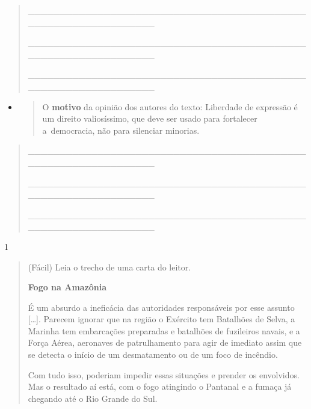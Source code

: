 \begin{itemize}
{{{\begin{itemize}
\begin{itemize}
\begin{itemize}
\begin{quote}
\_\_\_\_\_\_\_\_\_\_\_\_\_\_\_\_\_\_\_\_\_\_\_\_\_\_\_\_\_\_\_\_\_\_\_\_\_\_\_\_\_\_\_\_\_\_\_\_\_\_\_\_\_\_\_\_\_\_\_\_\_\_\_\_

\_\_\_\_\_\_\_\_\_\_\_\_\_\_\_\_\_\_\_\_\_\_\_\_\_\_\_\_\_\_\_\_\_\_\_\_\_\_\_\_\_\_\_\_\_\_\_\_\_\_\_\_\_\_\_\_\_\_\_\_\_\_\_\_

\_\_\_\_\_\_\_\_\_\_\_\_\_\_\_\_\_\_\_\_\_\_\_\_\_\_\_\_\_\_\_\_\_\_\_\_\_\_\_\_\_\_\_\_\_\_\_\_\_\_\_\_\_\_\_\_\_\_\_\_\_\_\_\_
\end{quote}

\begin{itemize}
\item
  \begin{quote}
  O \textbf{motivo} da opinião dos autores do texto: Liberdade de
  expressão é um direito valiosíssimo, que deve ser usado para
  fortalecer a~democracia, não para silenciar minorias.
  \end{quote}
\end{itemize}

\begin{quote}
\_\_\_\_\_\_\_\_\_\_\_\_\_\_\_\_\_\_\_\_\_\_\_\_\_\_\_\_\_\_\_\_\_\_\_\_\_\_\_\_\_\_\_\_\_\_\_\_\_\_\_\_\_\_\_\_\_\_\_\_\_\_\_\_

\_\_\_\_\_\_\_\_\_\_\_\_\_\_\_\_\_\_\_\_\_\_\_\_\_\_\_\_\_\_\_\_\_\_\_\_\_\_\_\_\_\_\_\_\_\_\_\_\_\_\_\_\_\_\_\_\_\_\_\_\_\_\_\_

\_\_\_\_\_\_\_\_\_\_\_\_\_\_\_\_\_\_\_\_\_\_\_\_\_\_\_\_\_\_\_\_\_\_\_\_\_\_\_\_\_\_\_\_\_\_\_\_\_\_\_\_\_\_\_\_\_\_\_\_\_\_\_\_
\end{quote}


\num{1}

\begin{quote}
(Fácil) Leia o trecho de uma carta do leitor.

\textbf{Fogo na Amazônia}

É um absurdo a ineficácia das autoridades responsáveis por esse assunto
{[}\ldots{}{]}. Parecem ignorar que na região o Exército tem Batalhões
de Selva, a Marinha tem embarcações preparadas e batalhões de fuzileiros
navais, e a Força Aérea, aeronaves de patrulhamento para agir de
imediato assim que se detecta o início de um desmatamento ou de um foco
de incêndio.

Com tudo isso, poderiam impedir essas situações e prender os envolvidos.
Mas o resultado aí está, com o fogo atingindo o Pantanal e a fumaça já
chegando até o Rio Grande do Sul.


\end{quote}
\end{itemize}
\end{itemize}
\end{itemize}}}}
\end{itemize}
